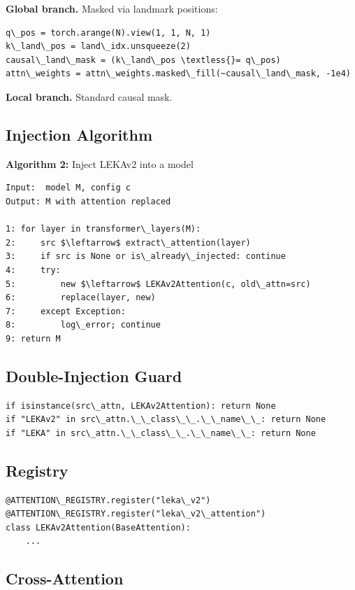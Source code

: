 \textbf{Global branch.} Masked via landmark positions:

\begin{lstlisting}
q\_pos = torch.arange(N).view(1, 1, N, 1)
k\_land\_pos = land\_idx.unsqueeze(2)
causal\_land\_mask = (k\_land\_pos \textless{}= q\_pos)
attn\_weights = attn\_weights.masked\_fill(~causal\_land\_mask, -1e4)
\end{lstlisting}

\textbf{Local branch.} Standard causal mask.

\subsection{Injection Algorithm}

\textbf{Algorithm 2:} Inject LEKAv2 into a model
\begin{lstlisting}
Input:  model M, config c
Output: M with attention replaced

1: for layer in transformer\_layers(M):
2:     src $\leftarrow$ extract\_attention(layer)
3:     if src is None or is\_already\_injected: continue
4:     try:
5:         new $\leftarrow$ LEKAv2Attention(c, old\_attn=src)
6:         replace(layer, new)
7:     except Exception:
8:         log\_error; continue
9: return M
\end{lstlisting}

\subsection{Double-Injection Guard}

\begin{lstlisting}
if isinstance(src\_attn, LEKAv2Attention): return None
if "LEKAv2" in src\_attn.\_\_class\_\_.\_\_name\_\_: return None
if "LEKA" in src\_attn.\_\_class\_\_.\_\_name\_\_: return None
\end{lstlisting}

\subsection{Registry}

\begin{lstlisting}
@ATTENTION\_REGISTRY.register("leka\_v2")
@ATTENTION\_REGISTRY.register("leka\_v2\_attention")
class LEKAv2Attention(BaseAttention):
    ...
\end{lstlisting}

\subsection{Cross-Attention}

